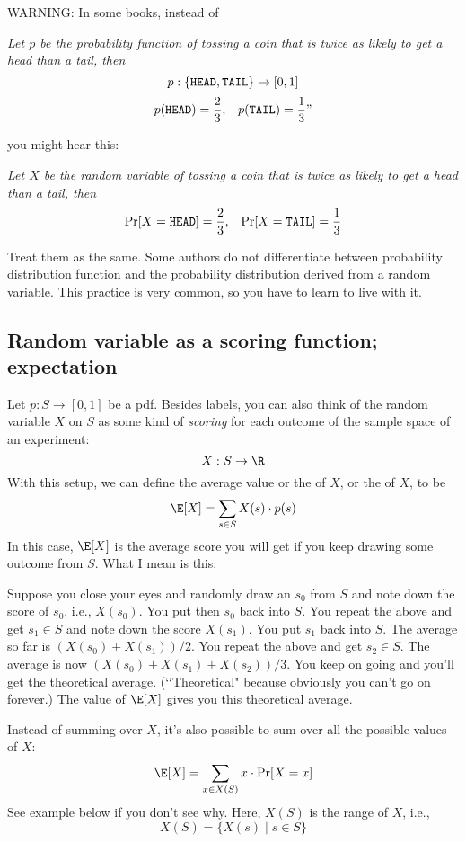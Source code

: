 \textsc{WARNING}: In some books, instead of 
\begin{itemize}
\li \textsl{Let $p$ be the probability function
of tossing a coin that is twice as likely to get a head than a tail,
then
\[
p : \{\texttt{HEAD}, \texttt{TAIL}\} \rightarrow [0,1] 
\]
\[
p(\texttt{HEAD}) = \frac{2}{3}, \,\,\,\,\,
p(\texttt{TAIL}) = \frac{1}{3}"
\]
}
\end{itemize}
you might hear this:
\begin{itemize}
\li \textsl{Let $X$ be the random variable of tossing a coin 
that is twice as likely to get a head than a tail, then
\[
\Pr[X = \texttt{HEAD}] = \frac{2}{3}, \,\,\,\,\,
\Pr[X = \texttt{TAIL}] = \frac{1}{3}
\]
}
\end{itemize}
Treat them as the same.
Some authors do not differentiate between probability distribution
function and the probability distribution derived from a
random variable.
This practice is very common, so you have to learn to live with it.



\newpage
\subsection{Random variable as a scoring function; expectation}

Let $p: S \rightarrow [0,1]$ be a pdf.
Besides labels,
you can also think of the random variable $X$ on $S$
as some kind of 
\textit{scoring}
for each outcome of the sample space of an experiment:
\[
  X : S \rightarrow \R
\]
With this setup, 
we can define the 
average value or the
 of $X$,
or the  of $X$,
to be
\[
\E[X] = \sum_{s \in S} X(s) \cdot p(s)
\]
In this case,
$\E[X]$ is the average score you will get if you keep
drawing some outcome from $S$.
What I mean is this:

Suppose you close your eyes and randomly draw an $s_0$ from $S$
and note down the score of $s_0$, i.e., $X(s_0)$.
You put then $s_0$ back into $S$.
You repeat the above and get $s_1 \in S$
and note down the score $X(s_1)$.
You put $s_1$ back into $S$.
The average so far is $(X(s_0) + X(s_1))/2$.
You repeat the above and get $s_2 \in S$.
The average is now $(X(s_0) + X(s_1) + X(s_2))/3$.
You keep on going and you'll get the
theoretical average.
(\lq\lq Theoretical" because obviously you can't go on forever.)
The value of $\E[X]$ gives you this theoretical average.

Instead of summing over $X$, it's also possible to sum over all the possible
values of $X$:
\[
\E[X] = \sum_{x \in X(S)} x \cdot \Pr[X = x]
\]
See example below if you don't see why.
Here, $X(S)$ is the range of $X$, i.e.,
\[
  X(S) = \{X(s) \mid s \in S \}
\]

